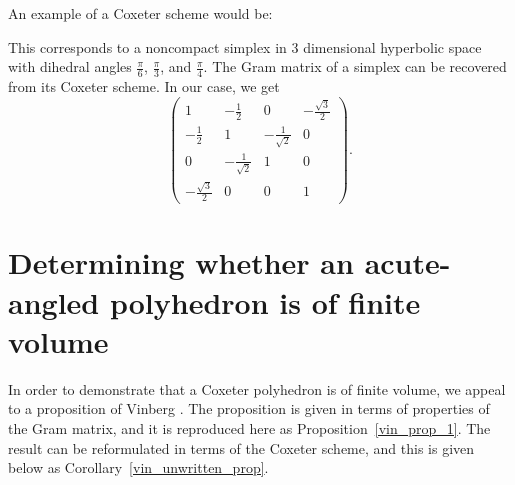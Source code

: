 \documentclass[smallcondensed]{svjour3}                     %
\begin{document}
\begin{example}\label{simplexexample}
An example of a Coxeter scheme would be:
\begin{figure}[h!]
  \centering
\end{figure}

This corresponds to a noncompact simplex in 3 dimensional hyperbolic space with dihedral angles $\frac{\pi}{6}$, $\frac{\pi}{3}$, and $\frac{\pi}{4}$. The Gram matrix of a simplex can be recovered from its Coxeter scheme. In our case, we get
\[\begin{pmatrix} 1 & -\frac{1}{2} & 0 & -\frac{\sqrt{3}}{2}\\
 -\frac{1}{2} & 1 & -\frac{1}{\sqrt{2}} &  0\\
  0  & -\frac{1}{\sqrt{2}} & 1 & 0\\
 -\frac{\sqrt{3}}{2} & 0  & 0 &  1
    \end{pmatrix}.\]
\end{example}

\section{Determining whether an acute-angled polyhedron is of finite volume}\label{finitevolume}
In order to demonstrate that a Coxeter polyhedron is of finite volume, we appeal to a proposition of Vinberg \cite{vinberg72(2)}. The proposition is given in terms of properties of the Gram matrix, and it is reproduced here as Proposition~\ref{vin_prop_1}. The result can be reformulated in terms of the Coxeter scheme, and this is given below as Corollary~\ref{vin_unwritten_prop}.
\end{document}
